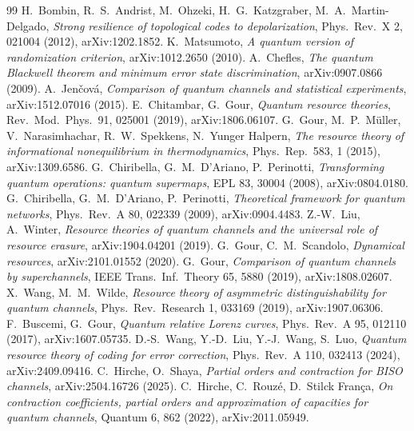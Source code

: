 \begin{thebibliography}{99}
 H.~Bombin, R.~S.~Andrist, M.~Ohzeki, H.~G.~Katzgraber, M.~A.~Martin-Delgado, \emph{Strong resilience of topological codes to depolarization}, Phys.\ Rev.\ X 2, 021004 (2012), arXiv:1202.1852. %
 K.~Matsumoto, \emph{A quantum version of randomization criterion}, arXiv:1012.2650 (2010). %
 A.~Chefles, \emph{The quantum Blackwell theorem and minimum error state discrimination}, arXiv:0907.0866 (2009). %
 A.~Jen\v{c}ov\'a, \emph{Comparison of quantum channels and statistical experiments}, arXiv:1512.07016 (2015). %
 E.~Chitambar, G.~Gour, \emph{Quantum resource theories}, Rev.\ Mod.\ Phys.\ 91, 025001 (2019), arXiv:1806.06107. %
 G.~Gour, M.~P.~M\"uller, V.~Narasimhachar, R.~W.~Spekkens, N.~Yunger Halpern, \emph{The resource theory of informational nonequilibrium in thermodynamics}, Phys.\ Rep.\ 583, 1 (2015), arXiv:1309.6586. %
 G.~Chiribella, G.~M.~D'Ariano, P.~Perinotti, \emph{Transforming quantum operations: quantum supermaps}, EPL 83, 30004 (2008), arXiv:0804.0180. %
 G.~Chiribella, G.~M.~D'Ariano, P.~Perinotti, \emph{Theoretical framework for quantum networks}, Phys.\ Rev.\ A 80, 022339 (2009), arXiv:0904.4483. %
 Z.-W.~Liu, A.~Winter, \emph{Resource theories of quantum channels and the universal role of resource erasure}, arXiv:1904.04201 (2019). %
 G.~Gour, C.~M.~Scandolo, \emph{Dynamical resources}, arXiv:2101.01552 (2020). %
 G.~Gour, \emph{Comparison of quantum channels by superchannels}, IEEE Trans.\ Inf.\ Theory 65, 5880 (2019), arXiv:1808.02607. %
 X.~Wang, M.~M.~Wilde, \emph{Resource theory of asymmetric distinguishability for quantum channels}, Phys.\ Rev.\ Research 1, 033169 (2019), arXiv:1907.06306. %
 F.~Buscemi, G.~Gour, \emph{Quantum relative Lorenz curves}, Phys.\ Rev.\ A 95, 012110 (2017), arXiv:1607.05735. %
 D.-S.~Wang, Y.-D.~Liu, Y.-J.~Wang, S.~Luo, \emph{Quantum resource theory of coding for error correction}, Phys.\ Rev.\ A 110, 032413 (2024), arXiv:2409.09416. %
 C.~Hirche, O.~Shaya, \emph{Partial orders and contraction for BISO channels}, arXiv:2504.16726 (2025). %
 C.~Hirche, C.~Rouz\'e, D.~Stilck Fran\c{c}a, \emph{On contraction coefficients, partial orders and approximation of capacities for quantum channels}, Quantum 6, 862 (2022), arXiv:2011.05949. %

\end{thebibliography}
